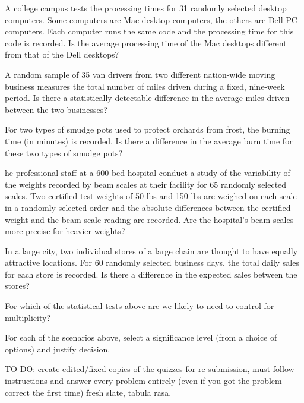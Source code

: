 A college campus tests the processing times for 31 randomly selected desktop computers. Some computers are Mac desktop computers, the others are Dell PC computers. Each computer runs the same code and the processing time for this code is recorded. Is the average processing time of the Mac desktops different from that of the Dell desktops? 

 A random sample of 35 van drivers from two different nation-wide moving business measures the total number of miles driven during a fixed, nine-week period. Is there a statistically detectable difference in the average miles driven between the two businesses? 

For two types of smudge pots used to protect orchards from frost, the burning time (in minutes) is recorded. Is there a difference in the average burn time for these two types of smudge pots? 

he professional staff at a 600-bed hospital conduct a study of the variability of the weights recorded by beam scales at their facility for 65 randomly selected scales. Two certified test weights of 50 lbs and 150 lbs are weighed on each scale in a randomly selected order and the absolute differences between the certified weight and the beam scale reading are recorded. Are the hospital's beam scales more precise for heavier weights? 

In a large city, two individual stores of a large chain are thought to have equally attractive locations. For 60 randomly selected business days, the total daily sales for each store is recorded. Is there a difference in the expected sales between the stores? 


For which of the statistical tests above are we likely to need to control for multiplicity?

For each of the scenarios above, select a significance level (from a choice of options) and justify decision. 



TO DO: create edited/fixed copies of the quizzes for re-submission, must follow instructions and answer every problem entirely (even if you got the problem correct the first time) fresh slate, tabula rasa. 